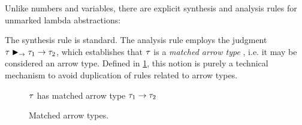 Unlike numbers and variables, there are explicit synthesis and analysis rules for unmarked lambda
abstractions: %
%
\begin{mathpar}

\end{mathpar}
%
The synthesis rule is standard. The analysis rule employs the judgment
$\matchedArrow{\TMV}{\TMV_1}{\TMV_2}$, which establishes that $\TMV$ is a \emph{matched arrow type}
\cite{cimini:2016}, i.e. it may be considered an arrow type. Defined in
\cref{fig:calculus-matched-arrow}, this notion is purely a technical mechanism to avoid duplication
of rules related to arrow types.


\begin{figure}[htbp]
  \raggedright
   $\TMV$ has matched arrow type $\TArrow{\TMV_1}{\TMV_2}$
  \begin{mathpar}

  \end{mathpar}
  \caption{Matched arrow types.}
  \label{fig:calculus-matched-arrow}
\end{figure}

